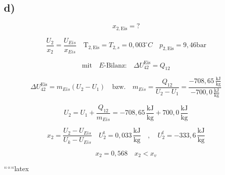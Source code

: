 

\subsection*{d)}

\[
x_{2, \text{Eis}} = ?
\]

\[
\frac{U_{2}}{x_{2}} = \frac{U_{Eis}}{x_{Eis}} \quad \text{T}_{2, \text{Eis}} = T_{2, s} = 0,003^\circ C \quad p_{2, \text{Eis}} = 9,46 \text{bar}
\]

\[
\text{mit} \quad E\text{-Bilanz:} \quad \Delta U_{42}^{\text{Eis}} = Q_{12}
\]

\[
\Delta U_{42}^{\text{Eis}} = m_{Eis} (U_{2} - U_{1}) \quad \text{bzw.} \quad m_{Eis} = \frac{Q_{12}}{U_{2} - U_{1}} = \frac{-708,65 \, \frac{\text{kJ}}{\text{kg}}}{-700,0 \, \frac{\text{kJ}}{\text{kg}}}
\]

\[
U_{2} = U_{1} + \frac{Q_{12}}{m_{Eis}} = -708,65 \, \frac{\text{kJ}}{\text{kg}} + 700,0 \, \frac{\text{kJ}}{\text{kg}}
\]

\[
x_{2} = \frac{U_{2} - U_{Eis}}{U_{k} - U_{Eis}} \quad U_{2}^{\text{t}} = 0,033 \, \frac{\text{kJ}}{\text{kg}} \quad , \quad U_{2}^{\text{f}} = -333,6 \, \frac{\text{kJ}}{\text{kg}}
\]

\[
x_{2} = 0,568 \quad x_{2} < x_{v}
\]

``````latex